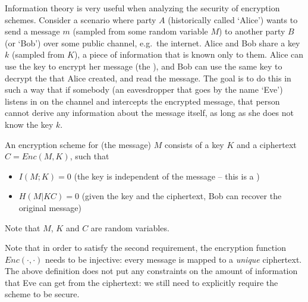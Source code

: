 Information theory is very useful when analyzing the security of encryption schemes. Consider a scenario where party $A$ (historically called `Alice') wants to send a message $m$ (sampled from some random variable $M$) to another party $B$ (or `Bob') over some public channel, e.g.\ the internet. Alice and Bob share a key $k$ (sampled from $K$), a piece of information that is known only to them. Alice can use the key to encrypt her message (the ), and Bob can use the same key to decrypt the  that Alice created, and read the message. The goal is to do this in such a way that if somebody (an eavesdropper that goes by the name `Eve') listens in on the channel and intercepts the encrypted message, that person cannot derive any information about the message itself, as long as she does not know the key $k$.

\begin{center}
\end{center}

\begin{definition}
An encryption scheme for (the message) $M$ consists of a key $K$ and a ciphertext $C = Enc(M,K)$, such that
\begin{itemize}
\item $I(M;K) = 0$ (the key is independent of the message -- this is a )
\item $H(M|KC) = 0$ (given the key and the ciphertext, Bob can recover the original message)
\end{itemize}
Note that $M$, $K$ and $C$ are random variables.
\end{definition}
Note that in order to satisfy the second requirement, the encryption function $Enc(\cdot,\cdot)$ needs to be injective: every message is mapped to a \emph{unique} ciphertext. The above definition does not put any constraints on the amount of information that Eve can get from the ciphertext: we still need to explicitly require the scheme to be secure.

